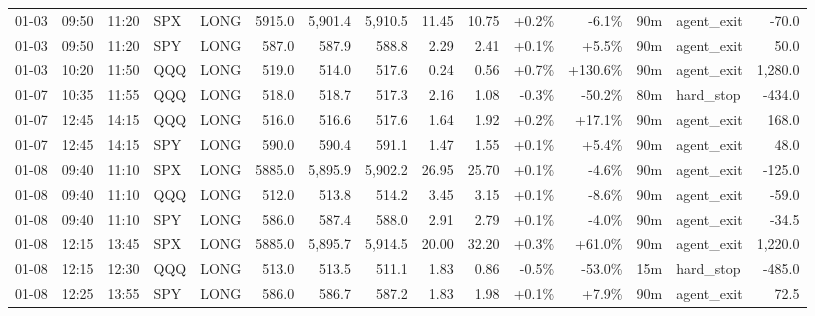 \documentclass[11pt,a4paper,twoside]{article}
\begin{document}
\begin{landscape}
\begin{center}
\begin{longtable}{>{\color{txtmain}}l l l l l r r r r r r r r >{\color{txtmain}}l r}
01-03 & 09:50 & 11:20 & SPX & LONG & 5915.0 & 5,901.4 & 5,910.5 & 11.45 & 10.75 & \textcolor{wingreen}{+0.2\%} & \textcolor{lossred}{-6.1\%} & 90m & agent\_exit & \textcolor{lossred}{-70.0} \\
01-03 & 09:50 & 11:20 & SPY & LONG & 587.0 & 587.9 & 588.8 & 2.29 & 2.41 & \textcolor{wingreen}{+0.1\%} & \textcolor{wingreen}{+5.5\%} & 90m & agent\_exit & \textcolor{wingreen}{50.0} \\
01-03 & 10:20 & 11:50 & QQQ & LONG & 519.0 & 514.0 & 517.6 & 0.24 & 0.56 & \textcolor{wingreen}{+0.7\%} & \textcolor{wingreen}{+130.6\%} & 90m & agent\_exit & \textcolor{wingreen}{1,280.0} \\
01-07 & 10:35 & 11:55 & QQQ & LONG & 518.0 & 518.7 & 517.3 & 2.16 & 1.08 & \textcolor{lossred}{-0.3\%} & \textcolor{lossred}{-50.2\%} & 80m & hard\_stop & \textcolor{lossred}{-434.0} \\
01-07 & 12:45 & 14:15 & QQQ & LONG & 516.0 & 516.6 & 517.6 & 1.64 & 1.92 & \textcolor{wingreen}{+0.2\%} & \textcolor{wingreen}{+17.1\%} & 90m & agent\_exit & \textcolor{wingreen}{168.0} \\
01-07 & 12:45 & 14:15 & SPY & LONG & 590.0 & 590.4 & 591.1 & 1.47 & 1.55 & \textcolor{wingreen}{+0.1\%} & \textcolor{wingreen}{+5.4\%} & 90m & agent\_exit & \textcolor{wingreen}{48.0} \\
01-08 & 09:40 & 11:10 & SPX & LONG & 5885.0 & 5,895.9 & 5,902.2 & 26.95 & 25.70 & \textcolor{wingreen}{+0.1\%} & \textcolor{lossred}{-4.6\%} & 90m & agent\_exit & \textcolor{lossred}{-125.0} \\
01-08 & 09:40 & 11:10 & QQQ & LONG & 512.0 & 513.8 & 514.2 & 3.45 & 3.15 & \textcolor{wingreen}{+0.1\%} & \textcolor{lossred}{-8.6\%} & 90m & agent\_exit & \textcolor{lossred}{-59.0} \\
01-08 & 09:40 & 11:10 & SPY & LONG & 586.0 & 587.4 & 588.0 & 2.91 & 2.79 & \textcolor{wingreen}{+0.1\%} & \textcolor{lossred}{-4.0\%} & 90m & agent\_exit & \textcolor{lossred}{-34.5} \\
01-08 & 12:15 & 13:45 & SPX & LONG & 5885.0 & 5,895.7 & 5,914.5 & 20.00 & 32.20 & \textcolor{wingreen}{+0.3\%} & \textcolor{wingreen}{+61.0\%} & 90m & agent\_exit & \textcolor{wingreen}{1,220.0} \\
01-08 & 12:15 & 12:30 & QQQ & LONG & 513.0 & 513.5 & 511.1 & 1.83 & 0.86 & \textcolor{lossred}{-0.5\%} & \textcolor{lossred}{-53.0\%} & 15m & hard\_stop & \textcolor{lossred}{-485.0} \\
01-08 & 12:25 & 13:55 & SPY & LONG & 586.0 & 586.7 & 587.2 & 1.83 & 1.98 & \textcolor{wingreen}{+0.1\%} & \textcolor{wingreen}{+7.9\%} & 90m & agent\_exit & \textcolor{wingreen}{72.5} \\

\end{longtable}
\end{center}
\end{landscape}
\end{document}
